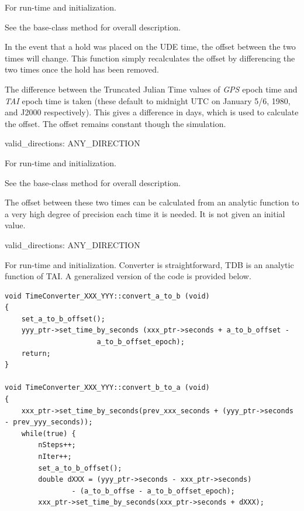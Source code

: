 {\begin{enumerate}
{\begin{enumerate}
For run-time and initialization.

See the base-class  method 
for overall description.

In the event that a hold was placed on the UDE time, the offset between
the two times will change.  This function simply recalculates the
offset by differencing the two times once the hold has been removed.
\end{enumerate}}




The difference between the Truncated Julian Time values of \textit{GPS}
epoch time and \textit{TAI} epoch time is taken (these default to
midnight UTC on January 5/6, 1980, and J2000 respectively).  This gives
a difference in days, which is used to calculate the offset.  The
offset remains constant though the simulation.

{\begin{enumerate}
valid\_directions:
ANY\_DIRECTION

For run-time and initialization. 

See the base-class  method 
for overall description.


\end{enumerate}}


The offset between these two times can be calculated from an analytic
function to a very high degree of precision each time it is needed.  It
is not given an initial value.

{\begin{enumerate}
valid\_directions:
ANY\_DIRECTION

For run-time and initialization. Converter is straightforward, TDB is an 
analytic function of TAI. A generalized version of the code is provided below.
\begin{verbatim}
void TimeConverter_XXX_YYY::convert_a_to_b (void)
{
	set_a_to_b_offset();
	yyy_ptr->set_time_by_seconds (xxx_ptr->seconds + a_to_b_offset - 
				      a_to_b_offset_epoch);
	return;
}

void TimeConverter_XXX_YYY::convert_b_to_a (void)
{
	xxx_ptr->set_time_by_seconds(prev_xxx_seconds + (yyy_ptr->seconds - prev_yyy_seconds));
	while(true) {
		nSteps++;
		nIter++;
		set_a_to_b_offset();
		double dXXX = (yyy_ptr->seconds - xxx_ptr->seconds)
			    - (a_to_b_offse - a_to_b_offset_epoch);
		xxx_ptr->set_time_by_seconds(xxx_ptr->seconds + dXXX);
		

\end{verbatim}
\end{enumerate}}
\end{enumerate}}
